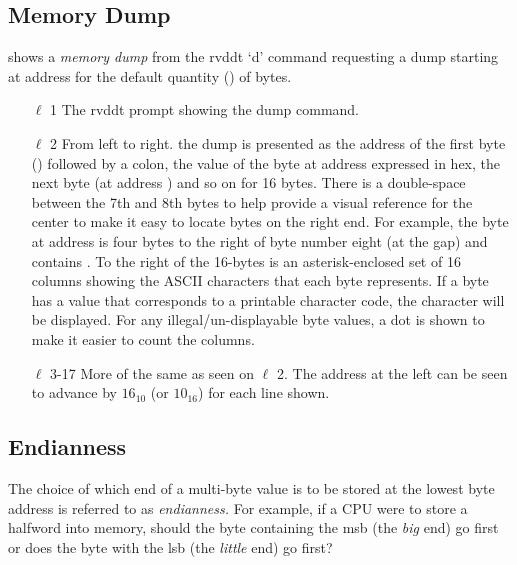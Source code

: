 \subsection{Memory Dump}

 shows a {\em memory dump} from the rvddt
`d' command requesting a dump starting at address 
for the default quantity () of bytes.


\begin{itemize}
\item [$\ell$ 1] The rvddt prompt showing the dump command.
\item [$\ell$ 2] From left to right. the dump is presented as the address 
	of the first byte () followed by a colon, the value
	of the byte at address  expressed in hex, the next byte
	(at address ) and so on for 16 bytes. There is a 
	double-space
	between the 7th and 8th bytes to help provide a visual reference for
	the center to make it easy to locate bytes on the right end.  For 
	example, the byte at address  is four bytes to the 
	right of byte number eight (at the gap) and contains .
	To the right of the 16-bytes is an asterisk-enclosed set of 16 columns
	showing the ASCII characters that each byte represents.  If a byte
	has a value that corresponds to a printable character code, the character
	will be displayed.  For any illegal/un-displayable byte values, a dot 
	is shown to make it easier to count the columns.
\item [$\ell$ 3-17] More of the same as seen on $\ell$ 2.  The address
	at the left can be seen to advance by $16_{10}$ (or $10_{16}$) 
	for each line shown.
\end{itemize}

\subsection{Endianness}

The choice of which end of a multi-byte value is to be stored at the
lowest byte address is referred to as {\em endianness.}  For example,
if a CPU were to store a \gls{halfword} into memory, should the byte 
containing the \acrfull{msb} (the {\em big} end) go first or does 
the byte with the \acrfull{lsb} (the {\em little} end) go first? 

